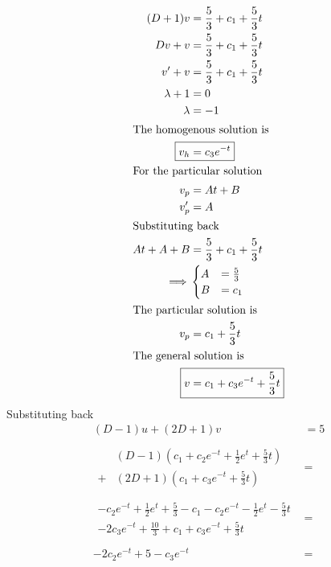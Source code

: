 \documentclass{zc-ust-hw}
\begin{document}
\begin{enumerate}
\begin{sol}
\begin{align}
          (D+1)v &= \frac{5}{3} + c_{1} + \frac{5}{3}t \\
          Dv+v &= \frac{5}{3} + c_{1} + \frac{5}{3}t \\
          v' + v &= \frac{5}{3} + c_{1} + \frac{5}{3}t \\
          \lambda + 1 &= 0 \\
          \lambda &= -1 \\
          \intertext{The homogenous solution is}
          \Aboxed{v_{h} &= c_{3}e^{-t}} \\
          \intertext{For the particular solution}
          v_{p} &= At + B \\
          v_{p}' &= A \\
          \intertext{Substituting back}
          At + A +B &= \frac{5}{3} + c_{1} + \frac{5}{3}t \\
          \implies&\begin{cases}
            A&=\frac{5}{3}\\
            B&=c_{1}
          \end{cases} \\
          \intertext{The particular solution is}
          v_{p}&=c_{1}+\frac{5}{3}t \\
          \intertext{The general solution is}
          \Aboxed{ v&=c_{1}+c_{3}e^{-t}+\frac{5}{3}t}
        \end{align}
          Substituting back
          \begin{align}
            (D-1)u+(2D+1)v&=5 \\
            \nonumber\\
            \begin{array}{ll}
            &(D-1)\left( c_{1}+c_{2}e^{-t} + \frac{1}{2}e^{t} + \frac{5}{3}t \right) \\
              +&(2D+1)\left( c_{1}+c_{3}e^{-t}+\frac{5}{3}t \right)
            \end{array}&=\\
            \nonumber\\
            \begin{array}{c}
              -c_{2}e^{-t}+\frac{1}{2}e^{t}+\frac{5}{3}-c_{1}-c_{2}e^{-t}-\frac{1}{2}e^{t}-\frac{5}{3}t\\
              -2c_{3}e^{-t}+\frac{10}{3}+c_{1}+c_{3}e^{-t}+\frac{5}{3}t
            \end{array}&=\\
            \nonumber\\
            -2c_{2}e^{-t}+5-c_{3}e^{-t}&=\\

\end{align}
\end{sol}
\end{enumerate}
\end{document}
